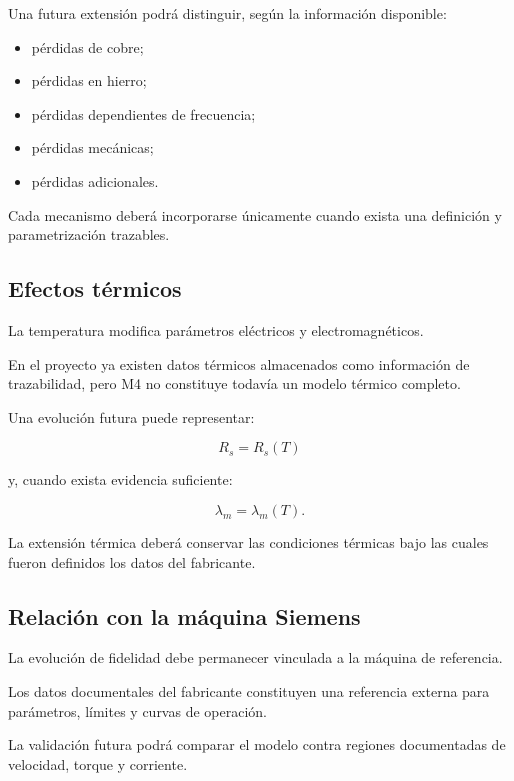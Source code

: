 Una futura extensión podrá distinguir, según la información disponible:

\begin{itemize}
\item pérdidas de cobre;
\item pérdidas en hierro;
\item pérdidas dependientes de frecuencia;
\item pérdidas mecánicas;
\item pérdidas adicionales.
\end{itemize}

Cada mecanismo deberá incorporarse únicamente cuando exista una definición y parametrización trazables.

\subsection{Efectos térmicos}

La temperatura modifica parámetros eléctricos y electromagnéticos.

En el proyecto ya existen datos térmicos almacenados como información de trazabilidad, pero M4 no constituye todavía un modelo térmico completo.

Una evolución futura puede representar:

\begin{equation}
R_s=R_s(T)
\end{equation}

y, cuando exista evidencia suficiente:

\begin{equation}
\lambda_m=\lambda_m(T).
\end{equation}

La extensión térmica deberá conservar las condiciones térmicas bajo las cuales fueron definidos los datos del fabricante.

\subsection{Relación con la máquina Siemens}

La evolución de fidelidad debe permanecer vinculada a la máquina de referencia.

Los datos documentales del fabricante constituyen una referencia externa para parámetros, límites y curvas de operación.

La validación futura podrá comparar el modelo contra regiones documentadas de velocidad, torque y corriente.

